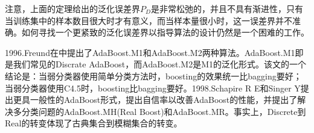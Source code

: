             \par
            注意，上面的定理给出的泛化误差界$P_D$是非常松弛的，并且不具有渐进性，只有当训练集中的样本数目很大时才有意义，而当样本量很小时，这一误差界并不准确。如何寻找一个更紧致的泛化误差界以指导算法的设计仍然是一个困难的工作。
            \par
            1996.Freund在\cite{1996.Freund}中提出了AdaBoost.M1和AdaBoost.M2两种算法。AdaBoost.M1即是我们常见的Discrate AdaBoost，而AdaBoost.M2是M1的泛化形式。该文的一个结论是：当弱分类器使用简单分类方法时，boosting的效果统一比bagging要好；当弱分类器使用C4.5时，boosting比bagging要好。1998.Schapire R E和Singer Y\cite{1998.Schapire}提出更具一般性的AdaBoost形式，提出自信率以改善AdaBoost的性能，并提出了解决多分类问题的AdaBoost.MH(Real Boost)和AdaBoost.MR。事实上，Discrete到Real的转变体现了古典集合到模糊集合的转变。


